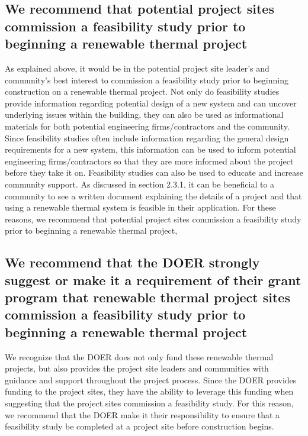 \subsection{We recommend that potential project sites commission a feasibility study prior to beginning a renewable thermal project}
\par As explained above, it would be in the potential project site leader's and community's best interest to commission a feasibility study prior to beginning construction on a renewable thermal project. Not only do feasibility studies provide information regarding potential design of a new system and can uncover underlying issues within the building, they can also be used as informational materials for both potential engineering firms/contractors and the community. Since feasibility studies often include information regarding the general design requirements for a new system, this information can be used to inform potential engineering firms/contractors so that they are more informed about the project before they take it on. Feasibility studies can also be used to educate and increase community support. As discussed in section 2.3.1, it can be beneficial to a community to see a written document explaining the details of a project and that using a renewable thermal system is feasible in their application. For these reasons, we recommend that potential project sites commission a feasibility study prior to beginning a renewable thermal project,

\subsection{We recommend that the DOER strongly suggest or make it a requirement of their grant program that renewable thermal project sites commission a feasibility study prior to beginning a renewable thermal project}
\par We recognize that the DOER does not only fund these renewable thermal projects, but also provides the project site leaders and communities with guidance and support throughout the project process. Since the DOER provides funding to the project sites, they have the ability to leverage this funding when suggesting that the project sites commission a feasibility study. For this reason, we recommend that the DOER make it their responsibility to ensure that a feasibility study be completed at a project site before construction begins.

